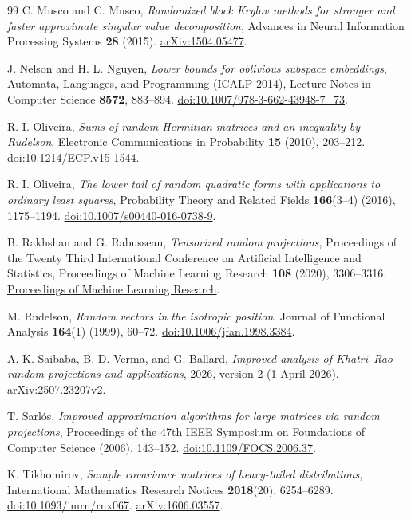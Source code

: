 \documentclass[11pt,a4paper]{article}
\theoremstyle{definition}\newtheorem{definition}[theorem]{Definition}
\theoremstyle{remark}\newtheorem{remark}[theorem]{Remark}
\numberwithin{equation}{section}
\begin{document}
\begin{thebibliography}{99}
C. Musco and C. Musco,
\emph{Randomized block Krylov methods for stronger and faster approximate singular value decomposition},
Advances in Neural Information Processing Systems \textbf{28} (2015).
\href{https://arxiv.org/abs/1504.05477}{arXiv:1504.05477}.

J. Nelson and H. L. Nguyen,
\emph{Lower bounds for oblivious subspace embeddings},
Automata, Languages, and Programming (ICALP 2014),
Lecture Notes in Computer Science \textbf{8572}, 883--894.
\href{https://doi.org/10.1007/978-3-662-43948-7_73}{doi:10.1007/978-3-662-43948-7\_73}.

R. I. Oliveira,
\emph{Sums of random Hermitian matrices and an inequality by Rudelson},
Electronic Communications in Probability \textbf{15} (2010), 203--212.
\href{https://doi.org/10.1214/ECP.v15-1544}{doi:10.1214/ECP.v15-1544}.

R. I. Oliveira,
\emph{The lower tail of random quadratic forms with applications to
ordinary least squares}, Probability Theory and Related Fields
\textbf{166}(3--4) (2016), 1175--1194.
\href{https://doi.org/10.1007/s00440-016-0738-9}{doi:10.1007/s00440-016-0738-9}.

B. Rakhshan and G. Rabusseau,
\emph{Tensorized random projections}, Proceedings of the Twenty Third
International Conference on Artificial Intelligence and Statistics,
Proceedings of Machine Learning Research \textbf{108} (2020), 3306--3316.
\href{https://proceedings.mlr.press/v108/rakhshan20a.html}{Proceedings of Machine Learning Research}.

M. Rudelson, \emph{Random vectors in the isotropic position},
Journal of Functional Analysis \textbf{164}(1) (1999), 60--72.
\href{https://doi.org/10.1006/jfan.1998.3384}{doi:10.1006/jfan.1998.3384}.

A. K. Saibaba, B. D. Verma, and G. Ballard,
\emph{Improved analysis of Khatri--Rao random projections and applications},
2026, version 2 (1 April 2026).
\href{https://arxiv.org/abs/2507.23207v2}{arXiv:2507.23207v2}.

T. Sarl\'os,
\emph{Improved approximation algorithms for large matrices via random projections},
Proceedings of the 47th IEEE Symposium on Foundations of Computer Science (2006), 143--152.
\href{https://doi.org/10.1109/FOCS.2006.37}{doi:10.1109/FOCS.2006.37}.

K. Tikhomirov,
\emph{Sample covariance matrices of heavy-tailed distributions},
International Mathematics Research Notices
\textbf{2018}(20), 6254--6289.
\href{https://doi.org/10.1093/imrn/rnx067}{doi:10.1093/imrn/rnx067}.
\href{https://arxiv.org/abs/1606.03557}{arXiv:1606.03557}.


\end{thebibliography}
\end{document}
